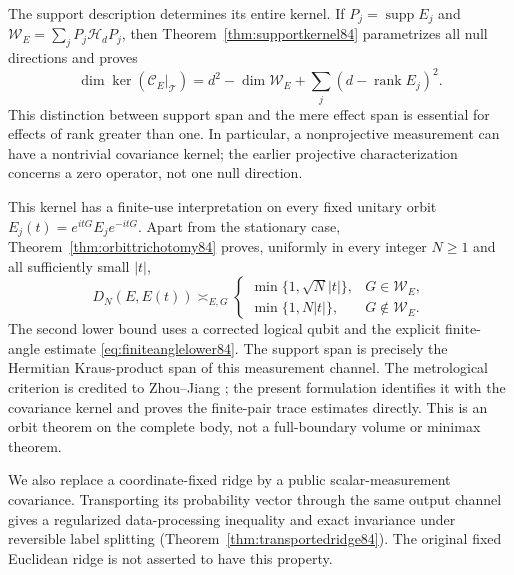 The support description determines its entire kernel.  If
$P_j=\operatorname{supp}E_j$ and
$\mathcal W_E=\sum_jP_j\mathcal H_dP_j$, then
Theorem~\ref{thm:supportkernel84} parametrizes all null directions
and proves
\[
 \dim\ker(\mathcal C_E|_{\mathcal T})
 =d^2-\dim\mathcal W_E+\sum_j(d-\operatorname{rank}E_j)^2.
\]
This distinction between support span and the mere effect span is
essential for effects of rank greater than one.  In particular,
a nonprojective measurement can have a nontrivial covariance kernel;
the earlier projective characterization concerns a zero operator,
not one null direction.

This kernel has a finite-use interpretation on every fixed unitary
orbit $E_j(t)=e^{itG}E_je^{-itG}$.  Apart from the stationary case,
Theorem~\ref{thm:orbittrichotomy84} proves, uniformly in every integer
$N\ge1$ and all sufficiently small $|t|$,
\begin{equation}\label{eq:frontorbit84}
 D_N(E,E(t))\asymp_{E,G}
 \begin{cases}
 \min\{1,\sqrt N|t|\},&G\in\mathcal W_E,\\
 \min\{1,N|t|\},&G\notin\mathcal W_E.
 \end{cases}
\end{equation}
The second lower bound uses a corrected logical qubit and the explicit
finite-angle estimate \eqref{eq:finiteanglelower84}.
The support span is precisely the Hermitian Kraus-product span of
this measurement channel.  The metrological criterion is credited
to Zhou--Jiang \cite{ZJ84}; the present formulation identifies it
with the covariance kernel and proves the finite-pair trace estimates
directly.  This is an orbit theorem on the complete body, not a
full-boundary volume or minimax theorem.

We also replace a coordinate-fixed ridge by a public scalar-measurement
covariance.  Transporting its probability vector through the same
output channel gives a regularized data-processing inequality and
exact invariance under reversible label splitting
(Theorem~\ref{thm:transportedridge84}).  The original fixed Euclidean
ridge is not asserted to have this property.

